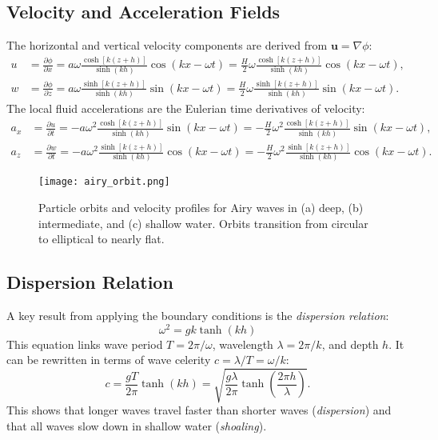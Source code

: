 \documentclass[11pt,a4paper]{article}
\begin{document}
\subsection{Velocity and Acceleration Fields}
The horizontal and vertical velocity components are derived from $\mathbf{u} = \nabla \phi$:
\begin{align}
u &= \frac{\partial \phi}{\partial x} = a\omega \frac{\cosh[k(z+h)]}{\sinh(kh)} \cos(kx - \omega t) = \frac{H}{2}\omega \frac{\cosh[k(z+h)]}{\sinh(kh)} \cos(kx - \omega t), \\
w &= \frac{\partial \phi}{\partial z} = a\omega \frac{\sinh[k(z+h)]}{\sinh(kh)} \sin(kx - \omega t) = \frac{H}{2}\omega \frac{\sinh[k(z+h)]}{\sinh(kh)} \sin(kx - \omega t).
\end{align}
The local fluid accelerations are the Eulerian time derivatives of velocity:
\begin{align}
a_x &= \frac{\partial u}{\partial t} = -a\omega^2 \frac{\cosh[k(z+h)]}{\sinh(kh)} \sin(kx - \omega t) = -\frac{H}{2}\omega^2 \frac{\cosh[k(z+h)]}{\sinh(kh)} \sin(kx - \omega t), \\
a_z &= \frac{\partial w}{\partial t} = -a\omega^2 \frac{\sinh[k(z+h)]}{\sinh(kh)} \cos(kx - \omega t) = -\frac{H}{2}\omega^2 \frac{\sinh[k(z+h)]}{\sinh(kh)} \cos(kx - \omega t).
\end{align}
\begin{figure}[H]
    \centering
    \texttt{[image: airy\_orbit.png]} %
    \caption{Particle orbits and velocity profiles for Airy waves in (a) deep, (b) intermediate, and (c) shallow water. Orbits transition from circular to elliptical to nearly flat.}
    \label{fig:airyorbits}
\end{figure}

\subsection{Dispersion Relation}
A key result from applying the boundary conditions is the \emph{dispersion relation}:
\begin{equation}
\omega^2 = gk \tanh(kh)
\label{eq:dispersion}
\end{equation}
This equation links wave period $T = 2\pi/\omega$, wavelength $\lambda = 2\pi/k$, and depth $h$. It can be rewritten in terms of wave celerity $c = \lambda/T = \omega/k$:
\begin{equation}
c = \frac{gT}{2\pi} \tanh(kh) = \sqrt{\frac{g\lambda}{2\pi} \tanh\left(\frac{2\pi h}{\lambda}\right)}.
\end{equation}
This shows that longer waves travel faster than shorter waves (\emph{dispersion}) and that all waves slow down in shallow water (\emph{shoaling}).
\end{document}
